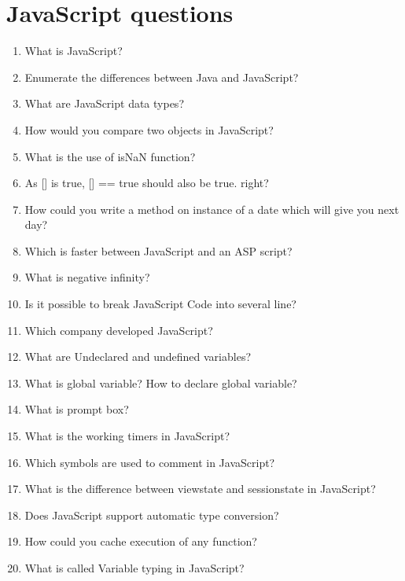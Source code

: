 \documentclass[11pt]{article}
\begin{document}
\section{JavaScript questions}
\label{sec:org12be35f}
\begin{enumerate}
\item What is JavaScript?
\item Enumerate the differences between Java and JavaScript?
\item What are JavaScript data types?
\item How would you compare two objects in JavaScript?
\item What is the use of isNaN function?
\item As [] is true, [] == true should also be true. right?
\item How could you write a method on instance of a date which will give you next day?
\item Which is faster between JavaScript and an ASP script?
\item What is negative infinity?
\item Is it possible to break JavaScript Code into several line?
\item Which company developed JavaScript?
\item What are Undeclared and undefined variables?
\item What is global variable? How to declare global variable?
\item What is prompt box?
\item What is the working timers in JavaScript?
\item Which symbols are used to comment in JavaScript?
\item What is the difference between viewstate and sessionstate in JavaScript?
\item Does JavaScript support automatic type conversion?
\item How could you cache execution of any function?
\item What is called Variable typing in JavaScript?
\end{enumerate}
\end{document}
